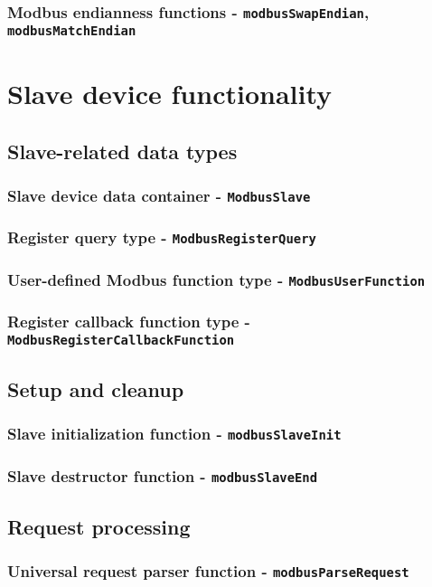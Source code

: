 \documentclass[11pt,a4paper]{article}
\begin{document}
\subsubsection{Modbus endianness functions - \texttt{modbusSwapEndian}, \texttt{modbusMatchEndian}}

\section{Slave device functionality}
\subsection{Slave-related data types}
\subsubsection{Slave device data container - \texttt{ModbusSlave}}
\subsubsection{Register query type - \texttt{ModbusRegisterQuery}}
\subsubsection{User-defined Modbus function type - \texttt{ModbusUserFunction}}
\subsubsection{Register callback function type - \texttt{ModbusRegisterCallbackFunction}}
\subsection{Setup and cleanup}
\subsubsection{Slave initialization function - \texttt{modbusSlaveInit}}
\subsubsection{Slave destructor function - \texttt{modbusSlaveEnd}}
\subsection{Request processing}
\subsubsection{Universal request parser function - \texttt{modbusParseRequest}}
\end{document}

